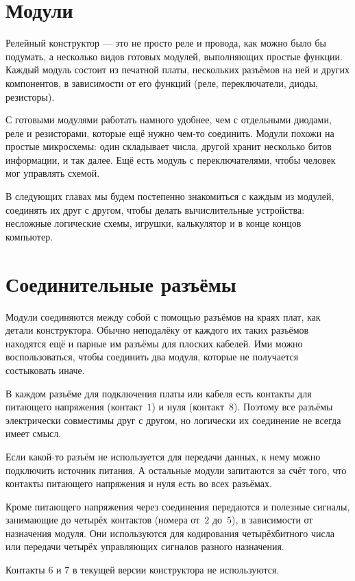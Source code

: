 \section{Модули}

Релейный конструктор --- это не просто реле и провода, как можно было бы подумать,
а несколько видов готовых модулей, выполняющих простые функции.
Каждый модуль состоит из печатной платы, нескольких разъёмов на ней
и других компонентов, в зависимости от его функций (реле, переключатели, диоды, резисторы).

С готовыми модулями работать намного удобнее, чем с отдельными диодами, реле и резисторами,
которые ещё нужно чем-то соединить.
Модули похожи на простые микросхемы: один складывает числа, другой
хранит несколько битов информации, и так далее. Ещё есть модуль с переключателями,
чтобы человек мог управлять схемой.

В следующих главах мы будем постепенно знакомиться с каждым из модулей, соединять их друг с другом,
чтобы делать вычислительные устройства: несложные логические схемы, игрушки, калькулятор и в конце концов компьютер.

\section{Соединительные разъёмы}

Модули соединяются между собой с помощью разъёмов на краях плат, как детали конструктора.
Обычно неподалёку от каждого их таких разъёмов находятся ещё и парные им разъёмы для плоских кабелей.
Ими можно воспользоваться, чтобы соединить два модуля, которые не получается состыковать иначе.

В каждом разъёме для подключения платы или кабеля есть контакты для питающего напряжения
(контакт~$1$) и нуля (контакт~$8$).
Поэтому все разъёмы электрически совместимы друг с другом, но логически их соединение не всегда
имеет смысл.

Если какой-то разъём не используется для передачи данных,
к нему можно подключить источник питания. А остальные модули запитаются за счёт того,
что контакты питающего напряжения и нуля есть во всех разъёмах.

Кроме питающего напряжения через соединения передаются и полезные сигналы, занимающие до четырёх контактов
(номера от~$2$ до~$5$), в зависимости от назначения модуля.
Они используются для кодирования четырёхбитного числа или передачи четырёх
управляющих сигналов разного назначения.

Контакты $6$ и $7$ в текущей версии конструктора не используются.



